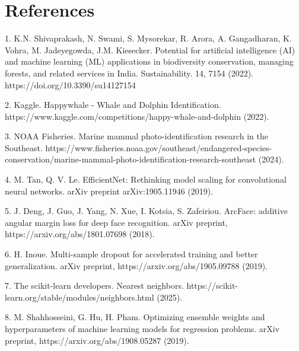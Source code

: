 \documentclass[twocolumn]{article}
\begin{document}
\section{References}
1. K.N. Shivaprakash, N. Swami, S. Mysorekar, R. Arora, A. Gangadharan, K. Vohra, M. Jadeyegowda, J.M. Kiesecker. Potential for artificial intelligence (AI) and machine learning (ML) applications in biodiversity conservation, managing forests, and related services in India. Sustainability. 14, 7154 (2022). https://doi.org/10.3390/su14127154

2. Kaggle. Happywhale - Whale and Dolphin Identification. https://www.kaggle.com/competitions/happy-whale-and-dolphin (2022).

3. NOAA Fisheries. Marine mammal photo-identification research in the Southeast. https://www.fisheries.noaa.gov/southeast/endangered-species-conservation/marine-mammal-photo-identification-research-southeast (2024).

4. M. Tan, Q. V. Le. EfficientNet: Rethinking model scaling for convolutional neural networks. arXiv preprint arXiv:1905.11946 (2019).

5. J. Deng, J. Guo, J. Yang, N. Xue, I. Kotsia, S. Zafeiriou. ArcFace: additive angular margin loss for deep face recognition. arXiv preprint, https://arxiv.org/abs/1801.07698 (2018).

6. H. Inoue. Multi-sample dropout for accelerated training and better generalization. arXiv preprint, https://arxiv.org/abs/1905.09788 (2019).

7. The scikit-learn developers. Nearest neighbors. https://scikit-learn.org/stable/modules/neighbors.html (2025).

8. M. Shahhosseini, G. Hu, H. Pham. Optimizing ensemble weights and hyperparameters of machine learning models for regression problems. arXiv preprint, https://arxiv.org/abs/1908.05287 (2019).
\end{document}
